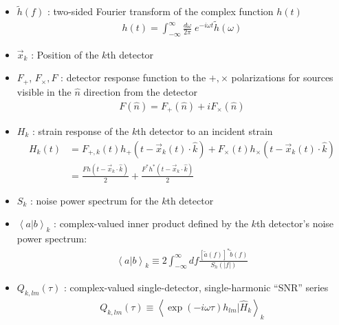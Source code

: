 \documentclass[twocolumn,prd,nofootinbib]{revtex4}
\newcommand\qmstateproduct[2]{\left\langle#1|#2\right\rangle}
\begin{document}
\begin{itemize}
\item 
$\tilde{h}(f)$ : two-sided Fourier transform of the complex function $h(t)$
\begin{eqnarray}
h(t) = \int_{-\infty}^{\infty} \frac{d \omega}{2\pi} \; e^{-i\omega t} \tilde{h}(\omega) 
\end{eqnarray}



\item 
$\vec{x}_k$ : Position of the $k$th detector

\item 
$F_{+}$, $F_{\times},F$ : detector response function  to the $+,\times$ polarizations for sources visible in the
  $\hat{n}$ direction from the detector
\begin{eqnarray}
F(\hat{n}) = F_+(\hat{n}) +i F_\times(\hat{n})
\end{eqnarray}

\item 
$H_k$ : strain response of the $k$th detector to an incident strain
\begin{align}
H_k(t) &=F_{+,k}(t) h_+(t-\vec{x}_k(t)\cdot \hat{k}) + F_\times(t) h_\times(t-\vec{x}_k(t)\cdot \hat{k}) \\
 &=  \frac{F h(t-\vec{x}_k\cdot \hat{k}) }{2} + \frac{F^*h^*(t-\vec{x}_k\cdot \hat{k})}{2}
\end{align}

\item 
$S_k$ : noise power spectrum for the $k$th detector

\item 
$\qmstateproduct{a}{b}_k$ : complex-valued inner product defined by the $k$th detector's noise power spectrum:
\begin{eqnarray}
\qmstateproduct{a}{b}_k \equiv 2 \int_{-\infty}^{\infty} df \frac{[\tilde{a}(f)]^*\tilde{b}(f)}{S_h(|f|) }
\end{eqnarray}


\item 
$Q_{k,lm}(\tau)$ : complex-valued single-detector, single-harmonic ``SNR'' series
\begin{eqnarray}
Q_{k,lm}(\tau) \equiv \qmstateproduct{\exp(-i\omega \tau) h_{lm}}{\hat{H}_k}_k
\end{eqnarray}

\end{itemize}
\end{document}
